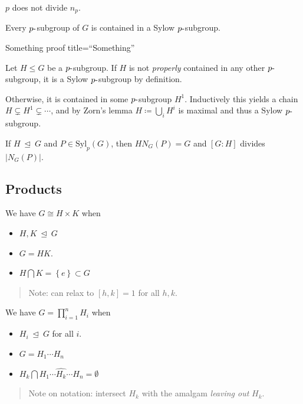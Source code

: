\(p\) does not divide \(n_p\).

Every \(p{\hbox{-}}\)subgroup of \(G\) is contained in a Sylow
\(p{\hbox{-}}\)subgroup.

Something proof title=``Something''

Let \(H \leq G\) be a \(p{\hbox{-}}\)subgroup. If \(H\) is not
\emph{properly} contained in any other \(p{\hbox{-}}\)subgroup, it is a
Sylow \(p{\hbox{-}}\)subgroup by definition.

Otherwise, it is contained in some \(p{\hbox{-}}\)subgroup \(H^1\).
Inductively this yields a chain \(H \subsetneq H^1 \subsetneq \cdots\),
and by Zorn's lemma \(H\coloneqq\bigcup_i H^i\) is maximal and thus a
Sylow \(p{\hbox{-}}\)subgroup.

If \(H{~\trianglelefteq~}G\) and \(P \in \mathrm{Syl}_p(G)\), then
\(H N_G(P) = G\) and \([G: H]\) divides
\({\left\lvert {N_G(P)} \right\rvert}\).

\hypertarget{products}{%
\subsection{Products}\label{products}}

We have \(G \cong H \times K\) when

\begin{itemize}
\item
  \(H, K {~\trianglelefteq~}G\)
\item
  \(G = HK\).
\item
  \(H\bigcap K = \left\{{e}\right\} \subset G\)
\end{itemize}

\begin{quote}
Note: can relax to \([h,k] = 1\) for all \(h, k\).
\end{quote}

We have \(G = \prod_{i=1}^n H_i\) when

\begin{itemize}
\item
  \(H_i {~\trianglelefteq~}G\) for all \(i\).
\item
  \(G = H_1 \cdots H_n\)
\item
  \(H_k \bigcap H_1 \cdots \widehat{H_k} \cdots H_n = \emptyset\)
\end{itemize}

\begin{quote}
Note on notation: intersect \(H_k\) with the amalgam \emph{leaving out}
\(H_k\).
\end{quote}

